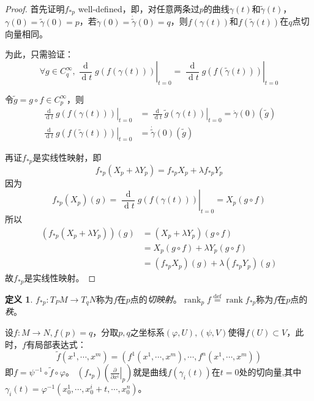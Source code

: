\documentclass[winfonts,UTF8,c5size,a4paper,fancyhdr,hyperref,titlepage,nocap]{ctexart}
\theoremstyle{definition}
\newtheorem{defn}[thm]{定义}
\theoremstyle{remark}
\numberwithin{equation}{subsection}
\newcommand{\red}{\color{red}}
\newcommand{\dt}{\frac{\operatorname{d}}{\operatorname{d}t}}
\newcommand{\pfrac}[2]{\frac{\partial{#1}}{\partial{#2}}}
\newcommand{\px}[1]{\left.\pfrac{}{x^{#1}}\right|_p}
\newcommand{\rank}{\operatorname{rank}}
\newcommand{\local}[2]{\left.{#1}\right|_{#2}}%
\newcommand{\localt}[1]{\local{#1}{t=0}}%
\newcommand{\defeq}{\stackrel{{\mathrm{def}}}{=}}
\begin{document}
\begin{proof}
  首先证明$f_{\ast p}$ well-defined，即，对任意两条过$p$的曲线$\gamma(t)$和$\widetilde{\gamma}(t)$，$\gamma(0)=\widetilde{\gamma}(0)=p$，若$\dot{\gamma}(0)=\dot{\widetilde{\gamma}}(0)=q$，则$f(\gamma(t))$和$f(\widetilde{\gamma}(t))$在$q$点切向量相同。

为此，只需验证：
\begin{equation*}
\forall g\in C^{\infty}_q, \localt{\dt g(f(\gamma(t)))}=\localt{\dt g(f(\widetilde{\gamma}(t)))}
\end{equation*}

令$\widetilde{g}=g\circ f\in C^{\infty}_p$，则
\begin{align*}
\localt{\dt g(f(\gamma(t)))}&=\localt{\dt \widetilde{g}(\gamma(t))}=\dot{\gamma}(0)(\widetilde{g})\\
\localt{\dt g(f(\widetilde{\gamma}(t)))}&=\dot{\widetilde{\gamma}}(0)(\widetilde{g})
\end{align*}

再证$f_{\ast p}$是实线性映射，即
\begin{equation*}
f_{\ast p}(X_p+\lambda Y_p)=f_{\ast p}X_p+\lambda f_{\ast p}Y_p
\end{equation*}
因为
\begin{equation*}
f_{\ast p}(X_p)(g)=\localt{\dt g(f(\gamma(t)))}=X_p(g\circ f)
\end{equation*}
所以
\begin{align*}
(f_{\ast p}(X_p+\lambda Y_p))(g)&=(X_p+\lambda Y_p)(g\circ f)\\
                                &=X_p(g\circ f)+\lambda Y_p(g\circ f)\\
                                &=(f_{\ast p}X_p)(g)+\lambda(f_{\ast p}Y_p)(g)
\end{align*}
故$f_{\ast p}$是实线性映射。
\end{proof}
\begin{defn}
$f_{\ast p}\colon T_PM\to T_qN$称为$f$在$p$点的\emph{\red 切映射}。$\rank_pf\defeq\rank f_{\ast p}$称为$f$在$p$点的\emph{\red 秩}。
\end{defn}
设$f\colon M\to N, f(p)=q$，分取$p,q$之坐标系$(\varphi,U),(\psi,V)$使得$f(U)\subset V$，此时，$f$有局部表达式：
\begin{equation*}
\widetilde{f}(x^1,\cdots,x^m)=(f^1(x^1,\cdots,x^m),\cdots,f^n(x^1,\cdots,x^m))
\end{equation*}
即$f=\psi^{-1}\circ\widetilde{f}\circ\varphi$。
$(f_{\ast p})(\px{i})$就是曲线$f(\gamma_i(t))$在$t=0$处的切向量,其中$\gamma_i(t)=\varphi^{-1}(x_0^1,\cdots,x_0^i+t,\cdots,x_0^n)$。
\end{document}
